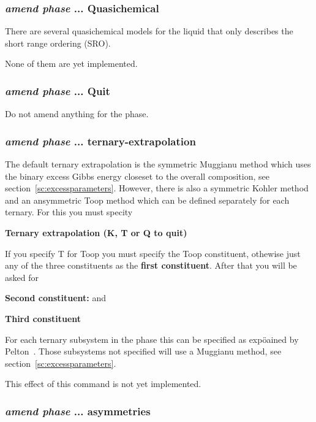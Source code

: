 \documentclass[11pt]{article}
\begin{document}
\hypertarget{Amend quasichemical}{}
\subsubsection{{\em amend phase} ... Quasichemical}

There are several quasichemical models for the liquid that only
describes the short range ordering (SRO).

None of them are yet implemented.

\hypertarget{Amend phase ... quit}{}
\subsubsection{{\em amend phase} ... Quit}

Do not amend anything for the phase.

\hypertarget{Amend phase ternary extrapol}{}
\subsubsection{{\em amend phase} ... ternary-extrapolation}\label{sc:kohler-toop2}

The default ternary extrapolation is the symmetric Muggianu method
which uses the binary excess Gibbs energy closeset to the overall
composition, see section~\ref{sc:excessparameters}.  However, there is
also a symmetric Kohler method and an ansymmetric Toop method which
can be defined separately for each ternary.  For this you must specity

{\bf Ternary extrapolation (K, T or Q to quit)}

If you specify T for Toop you must specify the Toop constituent,
othewise just any of the three constituents as the {\bf first
  constituent}.  After that you will be asked for

{\bf Second constituent:} and

{\bf Third constituent}

For each ternary subsystem in the phase this can be specified as
expöained by Pelton~\cite{01Pel}.  Those subsystems not specified will
use a Muggianu method, see section~\ref{sc:excessparameters}.

This effect of this command is not yet implemented.

\hypertarget{Amend phase asymmetries}{}
\hypertarget{Asymmetry modify}{}
\subsubsection{{\em amend phase} ... asymmetries}
\end{document}
